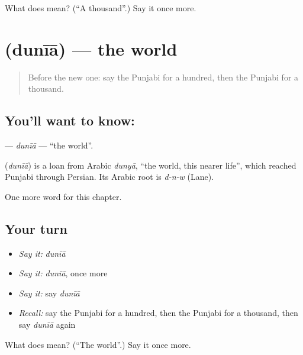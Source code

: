 \begin{tcolorbox}[breakable,colback=teal!4,colframe=teal!35!black,title={Before you move on}]
What does  mean? (\textquotedblleft{}A thousand\textquotedblright{}.) Say it once more.
\end{tcolorbox}
\section[\texorpdfstring{\pa{ਦੁਨੀਆ} (dunīā)}{ਦੁਨੀਆ (dunīā)}]{ (dunīā) — the world}

\label{lesson:PA-C97-dunia}



\begin{quote}
Before the new one: say the Punjabi for a hundred, then the Punjabi for a thousand.
\end{quote}

\subsection*{You'll want to know: }
\textbf{} — \emph{dunīā} — \textquotedblleft{}the world\textquotedblright{}.

\begin{cousinweb}
\textbf{} (\emph{dunīā}) is a loan from Arabic \emph{dunyā}, \textquotedblleft{}the world, this nearer life\textquotedblright{}, which reached Punjabi through Persian. Its Arabic root is \emph{d-n-w} (Lane).
\end{cousinweb}

\begin{grammarlens}[title={What you've built}]
One more word for this chapter.
\end{grammarlens}

\subsection*{Your turn}
\begin{itemize}
\raggedright
  \item \emph{Say it:} \emph{dunīā}
  \item \emph{Say it:} \emph{dunīā}, once more
  \item \emph{Say it:} say \emph{dunīā}
  \item \emph{Recall:} say the Punjabi for a hundred, then the Punjabi for a thousand, then say \emph{dunīā} again
\end{itemize}

\begin{tcolorbox}[breakable,colback=teal!4,colframe=teal!35!black,title={Before you move on}]
What does  mean? (\textquotedblleft{}The world\textquotedblright{}.) Say it once more.
\end{tcolorbox}
